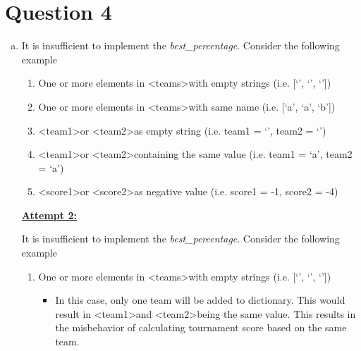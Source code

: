 \documentclass[12pt]{article}
\begin{document}
\bigskip

\section*{Question 4}
\begin{enumerate}[a.]
    \item

    It is insufficient to implement the \textit{best\_percentage}. Consider the
    following example

    \bigskip

    \begin{enumerate}[1.]
        \item One or more elements in \textless teams\textgreater with empty
        strings (i.e. [`', `', `'])
        \item One or more elements in \textless teams\textgreater with same
        name (i.e. [`a', `a', `b'])
        \item \textless team1\textgreater or \textless team2\textgreater as
        empty string (i.e. team1 = `', team2 = `')
        \item \textless team1\textgreater or \textless team2\textgreater containing
        the same value (i.e. team1 = `a', team2 = `a')
        \item \textless score1\textgreater or \textless score2\textgreater as
        negative value (i.e. score1 = -1, score2 = -4)
    \end{enumerate}

    \newpage

    \begin{mdframed}
        \underline{\textbf{Attempt 2:}}

        \bigskip

        It is insufficient to implement the \textit{best\_percentage}. Consider the
        following example

        \bigskip

        \begin{enumerate}[1.]
            \item One or more elements in \textless teams\textgreater with empty
            strings (i.e. [`', `', `'])
            \begin{itemize}
                \item In this case, only one team will be added to dictionary.
                This would result in \textless team1\textgreater and
                \textless team2\textgreater being the same value. This results in
                the misbehavior of calculating tournament score based on the
                same team.
            \end{itemize}


\end{enumerate}
\end{mdframed}
\end{enumerate}
\end{document}

